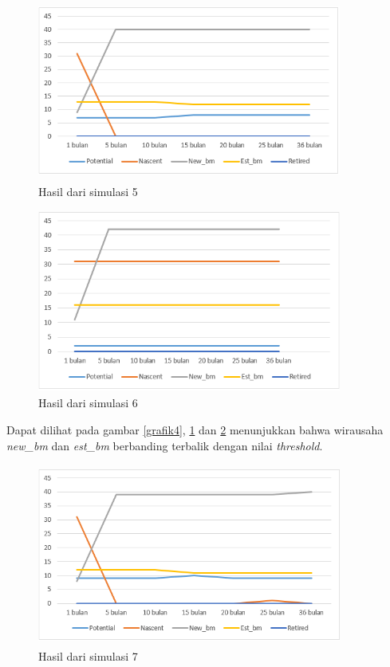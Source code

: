 	\begin{figure} [H]
	\centering  
	\includegraphics[width=10cm, height=6cm]{grafik5} 
		\caption[Hasil dari simulasi]{Hasil dari simulasi 5}
	\label{grafik5} 
\end{figure}

	\begin{figure} [H]
	\centering  
	\includegraphics[width=10cm, height=6cm]{grafik6} 
		\caption[Hasil dari simulasi]{Hasil dari simulasi 6}
	\label{grafik6} 
\end{figure}

Dapat dilihat pada gambar \ref{grafik4}, \ref{grafik5} dan \ref{grafik6} menunjukkan bahwa wirausaha \textit{new\_bm} dan \textit{est\_bm} berbanding terbalik dengan nilai \textit{threshold}.

	\begin{figure} [H]
	\centering  
	\includegraphics[width=10cm, height=6cm]{grafik7} 
		\caption[Hasil dari simulasi]{Hasil dari simulasi 7}
	\label{grafik7} 
\end{figure}

